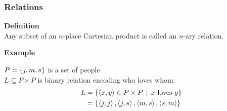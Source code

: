 \documentclass[fleqn,10pt,serif,xcolor=svgnames,xcolor=table,aspectratio=169,handout]{beamer}
\begin{document}



\begin{frame}
  \frametitle{Relations}

  \textbf{{\color{themecolor}Definition}}\\
  Any subset of an $n$-place Cartesian product is called an $n$-ary relation.

  \bigskip

  \textbf{{\color{themecolor}Example}}\\
  \begin{minipage}{0.65\linewidth}
    $P = \left\{j,m,s\right\}$ is a set of people\\
    $L \subseteq P \times P$ is binary relation encoding who loves whom:
    \begin{align*}
      L & = \left\{\left \langle x,y\right\rangle \in P \times P \thinspace \mid \thinspace \text{$x$ loves $y$}\right\} \\
        & = \left\{\left \langle j,j\right\rangle, \left \langle j,s\right\rangle, \left \langle m,s\right\rangle, \left \langle s,m\right\rangle\right\}
    \end{align*}
  \end{minipage}
  \hfill
  \begin{minipage}{0.3\linewidth}
    \begin{center}
    \end{center}
  \end{minipage}

\end{frame}
\end{document}
